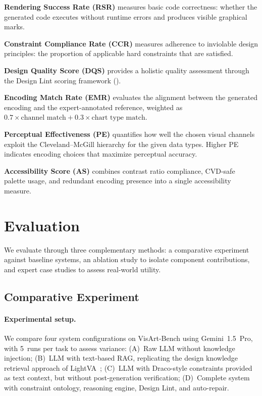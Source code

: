 \textbf{Rendering Success Rate (RSR)} measures basic code correctness: whether the generated code executes without runtime errors and produces visible graphical marks.

\textbf{Constraint Compliance Rate (CCR)} measures adherence to inviolable design principles: the proportion of applicable hard constraints that are satisfied.

\textbf{Design Quality Score (DQS)} provides a holistic quality assessment through the Design Lint scoring framework ().

\textbf{Encoding Match Rate (EMR)} evaluates the alignment between the generated encoding and the expert-annotated reference, weighted as $0.7 \times \text{channel match} + 0.3 \times \text{chart type match}$.

\textbf{Perceptual Effectiveness (PE)} quantifies how well the chosen visual channels exploit the Cleveland--McGill hierarchy for the given data types. Higher PE indicates encoding choices that maximize perceptual accuracy.

\textbf{Accessibility Score (AS)} combines contrast ratio compliance, CVD-safe palette usage, and redundant encoding presence into a single accessibility measure.


\section{Evaluation}
\label{sec:eval}

We evaluate \sysname{} through three complementary methods: a comparative experiment against baseline systems, an ablation study to isolate component contributions, and expert case studies to assess real-world utility.

\subsection{Comparative Experiment}

\paragraph{Experimental setup.}
We compare four system configurations on VisArt-Bench using Gemini~1.5~Pro, with 5~runs per task to assess variance:
(A)~Raw LLM without knowledge injection;
(B)~LLM with text-based RAG, replicating the design knowledge retrieval approach of LightVA~\cite{li2024lightva};
(C)~LLM with Draco-style constraints provided as text context, but without post-generation verification;
(D)~Complete \sysname{} system with constraint ontology, reasoning engine, Design Lint, and auto-repair.

